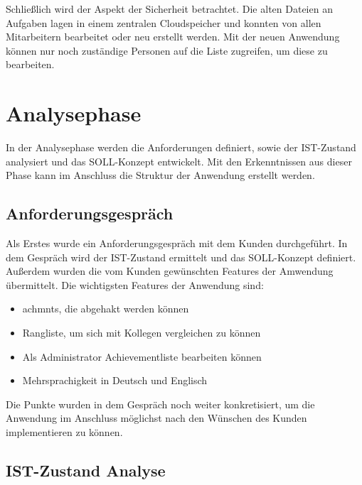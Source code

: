 \documentclass[11pt]{article}
\begin{document}
Schließlich wird der Aspekt der Sicherheit betrachtet. Die alten Dateien an Aufgaben lagen in einem zentralen Cloudspeicher und konnten von allen Mitarbeitern bearbeitet
oder neu erstellt werden. Mit der neuen Anwendung können nur noch zuständige Personen auf die Liste zugreifen, um diese zu bearbeiten.  



%
%

\section{Analysephase}
In der Analysephase werden die Anforderungen definiert, sowie der IST-Zustand analysiert und das
SOLL-Konzept entwickelt. Mit den Erkenntnissen aus dieser Phase kann im Anschluss die Struktur
der Anwendung erstellt werden.

\subsection{Anforderungsgespräch}
Als Erstes wurde ein Anforderungsgespräch mit dem Kunden durchgeführt.
In dem Gespräch wird der IST-Zustand ermittelt und das SOLL-Konzept definiert.
Außerdem wurden die vom Kunden gewünschten Features der Amwendung übermittelt.
Die wichtigsten Features der Anwendung sind:

\begin{itemize} 
    \item \glspl{achmnt}, die abgehakt werden können
    \item Rangliste, um sich mit Kollegen vergleichen zu können
    \item Als Administrator Achievementliste bearbeiten können 
    \item Mehrsprachigkeit in Deutsch und Englisch
\end{itemize}

Die Punkte wurden in dem Gespräch noch weiter konkretisiert, um die Anwendung
im Anschluss möglichst nach den Wünschen des Kunden implementieren zu können.


\subsection{IST-Zustand Analyse}
\end{document}
